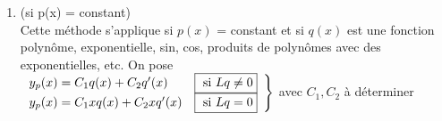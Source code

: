 \documentclass[12pt,a4paper]{article}
\begin{document}
\begin{enumerate}[label=\roman*)]
\begin{enumerate}
	 		\item {} (si p(x) = constant)\\
	 			Cette méthode s'applique si $p(x)$ = constant et si $q(x)$ est une fonction polynôme, exponentielle, sin, cos, produits de polynômes avec des exponentielles, etc. On pose\\
	 			$\left.\begin{array}{ll}
	 				y_p(x) = C_1q(x) + C_2q'(x) & \text{\fbox{ si $Lq \neq 0$}}\\
	 				y_p(x) = C_1xq(x) + C_2xq'(x) & \text{\fbox{ si  $Lq = 0$}}
	 			\end{array}\right\}$
	 			avec $C_1, C_2$ à déterminer
	 	\end{enumerate}
\end{enumerate}
\end{document}
